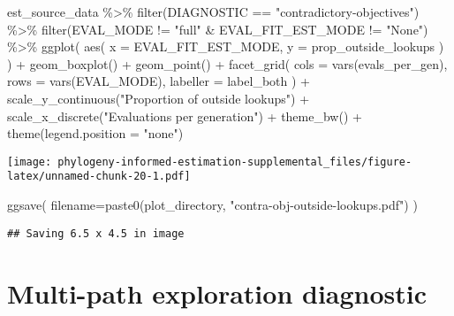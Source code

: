 \documentclass[
]{book}
\newenvironment{Shaded}{\begin{snugshade}}{\end{snugshade}}
\newcommand{\AttributeTok}[1]{\textcolor[rgb]{0.77,0.63,0.00}{#1}}
\newcommand{\FunctionTok}[1]{\textcolor[rgb]{0.00,0.00,0.00}{#1}}
\newcommand{\NormalTok}[1]{#1}
\newcommand{\SpecialCharTok}[1]{\textcolor[rgb]{0.00,0.00,0.00}{#1}}
\newcommand{\StringTok}[1]{\textcolor[rgb]{0.31,0.60,0.02}{#1}}
\begin{document}
\begin{Shaded}
\begin{Highlighting}[]
\NormalTok{est\_source\_data }\SpecialCharTok{\%\textgreater{}\%}
  \FunctionTok{filter}\NormalTok{(DIAGNOSTIC }\SpecialCharTok{==} \StringTok{"contradictory{-}objectives"}\NormalTok{) }\SpecialCharTok{\%\textgreater{}\%}
  \FunctionTok{filter}\NormalTok{(EVAL\_MODE }\SpecialCharTok{!=} \StringTok{"full"} \SpecialCharTok{\&}\NormalTok{ EVAL\_FIT\_EST\_MODE }\SpecialCharTok{!=} \StringTok{"None"}\NormalTok{) }\SpecialCharTok{\%\textgreater{}\%}
  \FunctionTok{ggplot}\NormalTok{(}
      \FunctionTok{aes}\NormalTok{(}
        \AttributeTok{x =}\NormalTok{ EVAL\_FIT\_EST\_MODE,}
        \AttributeTok{y =}\NormalTok{ prop\_outside\_lookups}
\NormalTok{      )}
\NormalTok{    ) }\SpecialCharTok{+}
    \FunctionTok{geom\_boxplot}\NormalTok{() }\SpecialCharTok{+}
    \FunctionTok{geom\_point}\NormalTok{() }\SpecialCharTok{+}
    \FunctionTok{facet\_grid}\NormalTok{(}
      \AttributeTok{cols =} \FunctionTok{vars}\NormalTok{(evals\_per\_gen),}
      \AttributeTok{rows =} \FunctionTok{vars}\NormalTok{(EVAL\_MODE),}
      \AttributeTok{labeller =}\NormalTok{ label\_both}
\NormalTok{    ) }\SpecialCharTok{+}
    \FunctionTok{scale\_y\_continuous}\NormalTok{(}\StringTok{"Proportion of outside lookups"}\NormalTok{) }\SpecialCharTok{+}
    \FunctionTok{scale\_x\_discrete}\NormalTok{(}\StringTok{"Evaluations per generation"}\NormalTok{) }\SpecialCharTok{+}
    \FunctionTok{theme\_bw}\NormalTok{() }\SpecialCharTok{+}
    \FunctionTok{theme}\NormalTok{(}\AttributeTok{legend.position =} \StringTok{"none"}\NormalTok{)}
\end{Highlighting}
\end{Shaded}

\texttt{[image: phylogeny-informed-estimation-supplemental\_files/figure-latex/unnamed-chunk-20-1.pdf]}

\begin{Shaded}
\begin{Highlighting}[]
\FunctionTok{ggsave}\NormalTok{(}
   \AttributeTok{filename=}\FunctionTok{paste0}\NormalTok{(plot\_directory, }\StringTok{"contra{-}obj{-}outside{-}lookups.pdf"}\NormalTok{)}
\NormalTok{)}
\end{Highlighting}
\end{Shaded}

\begin{verbatim}
## Saving 6.5 x 4.5 in image
\end{verbatim}

\hypertarget{multi-path-exploration-diagnostic}{%
\section{Multi-path exploration diagnostic}\label{multi-path-exploration-diagnostic}}
\end{document}
